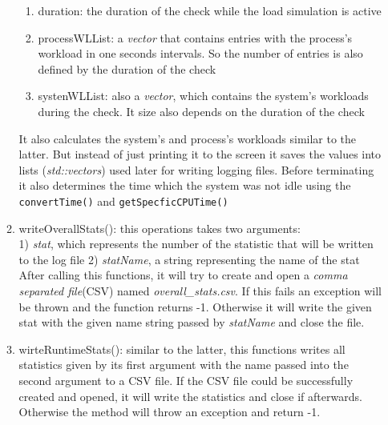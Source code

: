 \begin{enumerate}
\begin{enumerate}
		\begin{enumerate}
			\item duration: the duration of the check while the load simulation is active
			\item processWLList: a \textit{vector} that contains entries with the process's workload in one seconds intervals. So the number of entries is also defined by the duration of the check
			\item systenWLList: also a \textit{vector}, which contains the system's workloads during the check. It size also depends on the duration of the check 
		\end{enumerate}
		It also calculates the system's and process's workloads similar to the latter. But instead of just printing it to the screen it saves the values into lists (\textit{std::vectors}) used later for writing logging files. Before terminating it also determines the time which the system was not idle using the \texttt{convertTime()} and \texttt{getSpecficCPUTime()}
		\item writeOverallStats(): this operations takes two arguments:\\
		1) \textit{stat}, which represents the number of the statistic that will be written to the log file 
		2) \textit{statName}, a string representing the name of the stat
		After calling this functions, it will try to create and open a \textit{comma separated file}(CSV) named \dq \textit{overall\_stats.csv}\dq{}. If this fails an exception will be thrown and the function returns -1. Otherwise it will write the given stat with the given name string passed by \textit{statName} and close the file.
		\item wirteRuntimeStats(): similar to the latter, this functions writes all statistics given by its first argument with the name passed into the second argument to a CSV file. If the CSV file could be successfully created and opened, it will write the statistics and close if afterwards. Otherwise the method will throw an exception and return -1.
	\end{enumerate}
\end{enumerate}
